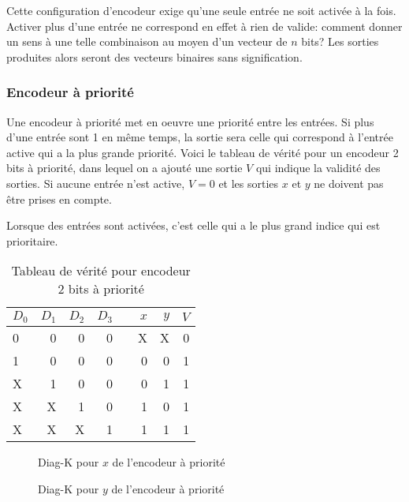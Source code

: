 \documentclass[11pt]{article}
\begin{document}
Cette configuration d'encodeur exige qu'une seule entrée ne soit
activée à la fois. Activer plus d'une entrée ne correspond en effet à
rien de valide: comment donner un sens à une telle combinaison au
moyen d'un vecteur de \(n\) bits? Les sorties produites alors seront
des vecteurs binaires sans signification.

\subsubsection{Encodeur à priorité}
\label{sec:orgc48d98b}

Une encodeur à priorité met en oeuvre une priorité entre les
entrées. Si plus d'une entrée sont 1 en même temps, la sortie sera
celle qui correspond à l'entrée active qui a la plus grande
priorité. Voici le tableau de vérité pour un encodeur 2 bits à priorité,
dans lequel on a ajouté une sortie \(V\) qui indique la validité des
sorties. Si aucune entrée n'est active, \(V=0\) et les sorties \(x\)
et \(y\) ne doivent pas être prises en compte.

Lorsque des entrées sont activées, c'est celle qui a le plus grand
indice qui est prioritaire.

\begin{table}[htbp]
\caption{\label{tab:org82b3fa2}Tableau de vérité pour encodeur 2 bits à priorité}
\centering
\begin{tabular}{lrrrlrrr}
\(D_0\) & \(D_1\) & \(D_2\) & \(D_3\) &  & \(x\) & \(y\) & \(V\)\\
\hline
0 & 0 & 0 & 0 &  & X & X & 0\\
1 & 0 & 0 & 0 &  & 0 & 0 & 1\\
X & 1 & 0 & 0 &  & 0 & 1 & 1\\
X & X & 1 & 0 &  & 1 & 0 & 1\\
X & X & X & 1 &  & 1 & 1 & 1\\
\end{tabular}
\end{table}

\begin{figure}[htbp]
\centering

\caption{\label{fig:org4abf74d}Diag-K pour \(x\) de l'encodeur à priorité}
\end{figure}

\begin{figure}[htbp]
\centering

\caption{\label{fig:org8a4d2b8}Diag-K pour \(y\) de l'encodeur à priorité}
\end{figure}
\end{document}
